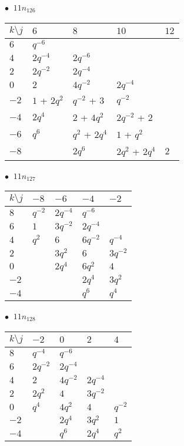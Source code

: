 %
\begin{minipage}{\linewidth}
$\bullet\ $ $11n_{126}$ \vspace{0.5em} \\
\begin{tabular}{l|llll}
$k \setminus j$ & $6$ & $8$ & $10$ & $12$ \\
\hline
$6$ & $q^{-6}$ &  &  &  \\
$4$ & $2q^{-4}$ & $2q^{-6}$ &  &  \\
$2$ & $2q^{-2}$ & $2q^{-4}$ &  &  \\
$0$ & $2$ & $4q^{-2}$ & $2q^{-4}$ &  \\
$-2$ & $1$ + $2q^{2}$ & $q^{-2}$ + $3$ & $q^{-2}$ &  \\
$-4$ & $2q^{4}$ & $2$ + $4q^{2}$ & $2q^{-2}$ + $2$ &  \\
$-6$ & $q^{6}$ & $q^{2}$ + $2q^{4}$ & $1$ + $q^{2}$ &  \\
$-8$ &  & $2q^{6}$ & $2q^{2}$ + $2q^{4}$ & $2$ \\
\end{tabular}
\vspace{2em}
\end{minipage}
%
\begin{minipage}{\linewidth}
$\bullet\ $ $11n_{127}$ \vspace{0.5em} \\
\begin{tabular}{l|llll}
$k \setminus j$ & $-8$ & $-6$ & $-4$ & $-2$ \\
\hline
$8$ & $q^{-2}$ & $2q^{-4}$ & $q^{-6}$ &  \\
$6$ & $1$ & $3q^{-2}$ & $2q^{-4}$ &  \\
$4$ & $q^{2}$ & $6$ & $6q^{-2}$ & $q^{-4}$ \\
$2$ &  & $3q^{2}$ & $6$ & $3q^{-2}$ \\
$0$ &  & $2q^{4}$ & $6q^{2}$ & $4$ \\
$-2$ &  &  & $2q^{4}$ & $3q^{2}$ \\
$-4$ &  &  & $q^{6}$ & $q^{4}$ \\
\end{tabular}
\vspace{2em}
\end{minipage}
%
\begin{minipage}{\linewidth}
$\bullet\ $ $11n_{128}$ \vspace{0.5em} \\
\begin{tabular}{l|llll}
$k \setminus j$ & $-2$ & $0$ & $2$ & $4$ \\
\hline
$8$ & $q^{-4}$ & $q^{-6}$ &  &  \\
$6$ & $2q^{-2}$ & $2q^{-4}$ &  &  \\
$4$ & $2$ & $4q^{-2}$ & $2q^{-4}$ &  \\
$2$ & $2q^{2}$ & $4$ & $3q^{-2}$ &  \\
$0$ & $q^{4}$ & $4q^{2}$ & $4$ & $q^{-2}$ \\
$-2$ &  & $2q^{4}$ & $3q^{2}$ & $1$ \\
$-4$ &  & $q^{6}$ & $2q^{4}$ & $q^{2}$ \\
\end{tabular}
\vspace{2em}
\end{minipage}
